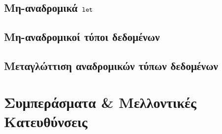\documentclass[diploma]{softlab-thesis}
\begin{document}


\section{Μη-αναδρομικά $\operatorname{\texttt{let}}$}



\section{Μη-αναδρομικοί τύποι δεδομένων}
\label{sec:non-recursive-data}


\section{Μεταγλώττιση αναδρομικών τύπων δεδομένων}
\label{sec:compile-recursive-datatypes}



\chapter{Συμπεράσματα \& Μελλοντικές Κατευθύνσεις}
\label{chap:chapter6}


\nocite{*}






\backmatter

\appendix

\end{document}
